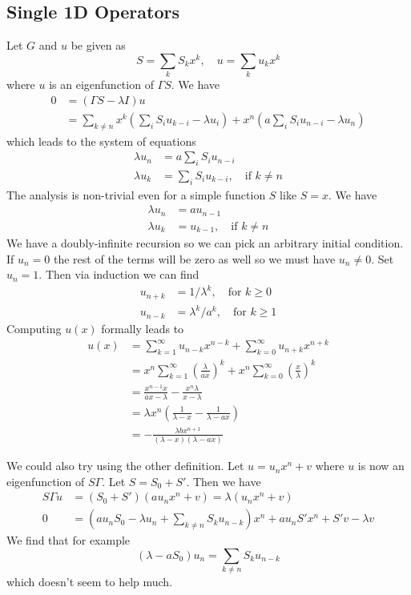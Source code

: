 \subsection{Single 1D Operators}
Let $G$ and $u$ be given as
\[
	S = \sum_k S_k x^k,\quad u = \sum_k u_k x^k
\]
where $u$ is an eigenfunction of $\Gamma S$. We have
\begin{align*}
	0&=(\Gamma S-\lambda I) u \\
	&= \sum_{k\neq n} x^k \left(\sum_i S_i u_{k-i} - \lambda u_i\right) + x^n \left(a\sum_i S_i u_{n-i} -\lambda u_n\right)
\end{align*}
which leads to the system of equations
\begin{align*}
	\lambda u_n &= a\sum_i S_i u_{n-i}\\
	\lambda u_k &= \sum_i S_i u_{k-i}, \quad \text{if } k \neq n
\end{align*}
The analysis is non-trivial even for a simple function $S$ like $S = x$. We have
\begin{align*}
	\lambda u_n &= a u_{n-1}\\
	\lambda u_k &= u_{k-1}, \quad \text{if } k \neq n
\end{align*}
We have a doubly-infinite recursion so we can pick an arbitrary initial condition. If $u_n = 0$ the rest of the terms will be zero as well so we must have $u_n \neq 0$. Set $u_n = 1$. Then via induction we can find
\begin{align*}
	u_{n+k} &= 1/\lambda^{k}, \quad \text{for $k \ge 0$}\\
	u_{n-k} &= \lambda^{k}/a^k, \quad \text{for $k \ge 1$}
\end{align*}
Computing $u(x)$ formally leads to
\begin{align*}
	u(x) &=  \sum_{k=1}^{\infty} u_{n-k}x^{n-k}+\sum_{k=0}^{\infty} u_{n+k}x^{n+k}\\
	        &= x^n\sum_{k=1}^{\infty}\left(\frac{\lambda}{ax}\right)^k +  x^n\sum_{k=0}^{\infty} \left(\frac{x}{\lambda}\right)^k\\
	        &= \frac{x^{n-1}x}{ax-\lambda}-\frac{x^n\lambda}{x-\lambda}\\
	        &=\lambda x^n\left(\frac{1}{\lambda -x}- \frac{1}{\lambda - ax}\right)\\
	        &=-\frac{\lambda b x^{n+1}}{(\lambda-x)(\lambda-ax)}
\end{align*}

We could also try using the other definition. Let $u = u_nx^n + v$ where $u$ is now an eigenfunction of $S\Gamma$. Let $S = S_0 + S'$. Then we have
\begin{align*}
	S\Gamma u &= (S_0+S')(au_nx^n+v) = \lambda(u_nx^n+v)\\
	0&=(au_nS_0-\lambda u_n+\sum_{k\neq n}S_k u_{n-k})x^n  + au_nS'x^n+S'v-\lambda v 
\end{align*}
We find that for example
\[
	(\lambda - a S_0)u_n = \sum_{k\neq n}S_k u_{n-k}
\]
which doesn't seem to help much. 

